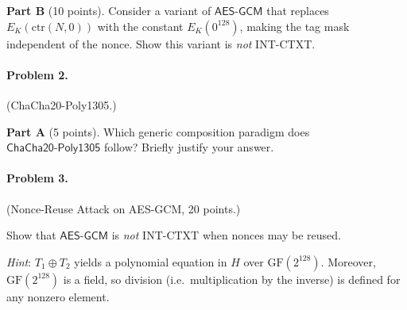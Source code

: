\documentclass[11pt]{article}
\newcommand{\GF}{\mathrm{GF}(2^{128})}
\newcommand{\AESGCM}{\mathsf{AES\text{-}GCM}}
\newcommand{\CCP}{\mathsf{ChaCha20\text{-}Poly1305}}
\newcommand{\ctr}{\mathrm{ctr}}
\begin{document}
\medskip

\noindent\textbf{Part B} (10 points).
Consider a variant of $\AESGCM$ that replaces $E_K(\ctr(N,0))$ with
the constant $E_K(0^{128})$, making the tag mask independent of the nonce.
Show this variant is \emph{not} INT-CTXT.

\bigskip

\paragraph*{Problem 2.} (ChaCha20-Poly1305.)

\noindent\textbf{Part A} (5 points).
Which generic composition paradigm does $\CCP$ follow? Briefly justify your answer.

\bigskip

\paragraph*{Problem 3.} (Nonce-Reuse Attack on AES-GCM, 20 points.)

\noindent
Show that $\AESGCM$ is \emph{not} INT-CTXT when nonces may be reused.

\noindent\emph{Hint}: $T_1 \oplus T_2$ yields a polynomial equation in $H$ over $\GF$. Moreover, $\GF$ is a field, so division (i.e.\ multiplication by the inverse) is defined for any nonzero element.
\end{document}
